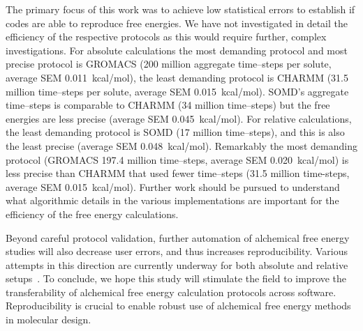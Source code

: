 \documentclass[journal=jctcce,manuscript=article]{achemso}
\begin{document}
The primary focus of this work was to achieve low statistical errors
to establish if codes are able to reproduce free energies.  We have
not investigated in detail the efficiency of the respective protocols
as this would require further, complex investigations.  For absolute
calculations the most demanding protocol and most precise protocol is
GROMACS (200 million aggregate time--steps per solute, average SEM
\SI{0.011}{kcal/mol}), the least demanding protocol is CHARMM (31.5 million
time--steps per solute, average SEM \SI{0.015}{kcal/mol}).  SOMD's aggregate
time--steps is comparable to CHARMM (34 million time--steps) but the
free energies are less precise (average SEM \SI{0.045}{kcal/mol}).
For relative calculations, the least demanding protocol is SOMD (17
million time--steps), and this is also the least precise (average SEM
\SI{0.048}{kcal/mol}).  Remarkably the most demanding protocol (GROMACS
197.4 million time--steps, average SEM \SI{0.020}{kcal/mol}) is less precise
than CHARMM that used fewer time--steps (31.5 million time-steps,
average SEM \SI{0.015}{kcal/mol}).  Further work should be pursued to
understand what algorithmic details in the various implementations are
important for the efficiency of the free energy calculations.

 Beyond careful protocol validation,  further automation of alchemical free energy studies will also decrease user errors, and thus increases  reproducibility.  Various attempts in
this direction are currently underway for both absolute and relative
setups~\cite{christ_accuracy_2013, JCC:JCC23804, Liu2013,
doi:10.1021/jp505332p, doi:10.1021/acs.jcim.6b00162,
doi:10.1021/acs.jctc.6b00979,loeffler_fesetup:_2015}. To conclude, we hope this study will stimulate the field to improve the transferability of alchemical free energy calculation protocols across software.  Reproducibility is crucial to enable robust use of alchemical free energy methods in molecular design.
\end{document}
